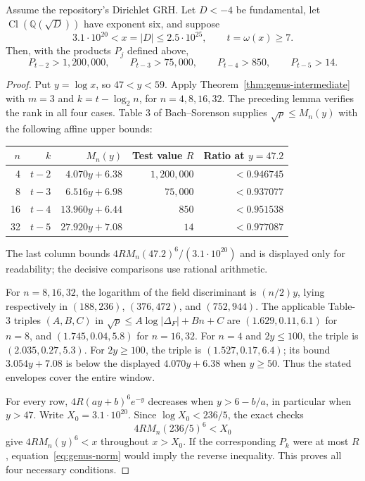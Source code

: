 \begin{theorem}
\label{thm:genus-four}
Assume the repository's Dirichlet GRH. Let $D<-4$ be fundamental, let
$\operatorname{Cl}(\mathbb Q(\sqrt D))$ have exponent six, and suppose
\[
 3.1\cdot10^{20}<x=|D|\le2.5\cdot10^{25},\qquad t=\omega(x)\ge7.
\]
Then, with the products $P_j$ defined above,
\begin{equation}\label{eq:genus-four}
 P_{t-2}>1{,}200{,}000,\qquad
 P_{t-3}>75{,}000,\qquad
 P_{t-4}>850,\qquad
 P_{t-5}>14.
\end{equation}
\end{theorem}

\begin{proof}
Put $y=\log x$, so $47<y<59$. Apply
Theorem~\ref{thm:genus-intermediate} with $m=3$ and
$k=t-\log_2 n$, for $n=4,8,16,32$. The preceding lemma verifies the
rank in all four cases. Table 3 of Bach--Sorenson supplies
$\sqrt p\le M_n(y)$ with the following affine upper bounds:
\begin{center}
\begin{tabular}{rrrrr}
\toprule
$n$ & $k$ & $M_n(y)$ & Test value $R$ & Ratio at $y=47.2$\\
\midrule
4 & $t-2$ & $4.070y+6.38$ & $1{,}200{,}000$ & $<0.946745$\\
8 & $t-3$ & $6.516y+6.98$ & $75{,}000$ & $<0.937077$\\
16 & $t-4$ & $13.960y+6.44$ & $850$ & $<0.951538$\\
32 & $t-5$ & $27.920y+7.08$ & $14$ & $<0.977087$\\
\bottomrule
\end{tabular}
\end{center}
The last column bounds $4R M_n(47.2)^6/(3.1\cdot10^{20})$ and is
displayed only for readability; the decisive comparisons use rational
arithmetic.

For $n=8,16,32$, the logarithm of the field discriminant is
$(n/2)y$, lying respectively in $(188,236)$, $(376,472)$, and
$(752,944)$. The applicable Table-3 triples $(A,B,C)$ in
$\sqrt p\le A\log|\Delta_F|+Bn+C$ are
$(1.629,0.11,6.1)$ for $n=8$, and $(1.745,0.04,5.8)$ for $n=16,32$.
For $n=4$ and $2y\le100$, the triple is $(2.035,0.27,5.3)$.
For $2y\ge100$, the triple is $(1.527,0.17,6.4)$; its bound
$3.054y+7.08$ is below the displayed $4.070y+6.38$ when $y\ge50$.
Thus the stated envelopes cover the entire window.

For every row, $4R(ay+b)^6e^{-y}$ decreases when $y>6-b/a$, in
particular when $y>47$. Write $X_0=3.1\cdot10^{20}$. Since
$\log X_0<236/5$, the exact checks
\[
                        4R M_n(236/5)^6<X_0
\]
give $4R M_n(y)^6<x$ throughout $x>X_0$. If the corresponding $P_k$
were at most $R$, equation~\eqref{eq:genus-norm} would imply the reverse
inequality. This proves all four necessary conditions.
\end{proof}

